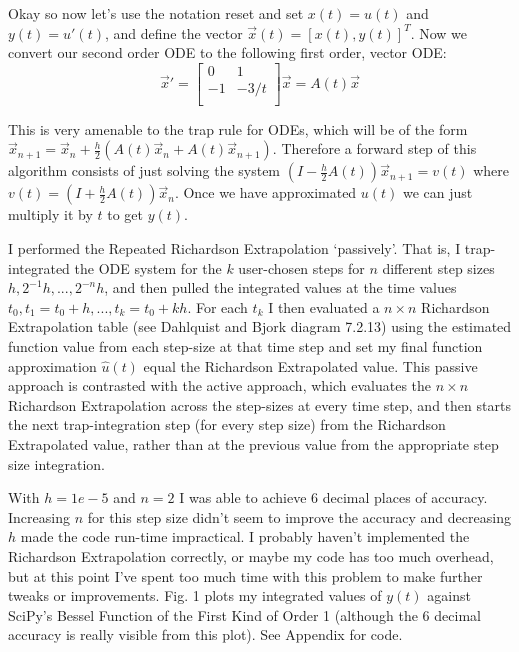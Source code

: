 \documentclass[10pt,a4paper]{article}
\begin{document}
Okay so now let's use the notation reset and set $x(t) = u(t)$ and $y(t) = u'(t)$, and define the vector $\vec{x}(t) = [x(t), y(t)]^T$.  Now we convert our second order ODE to the following first order, vector ODE:
\begin{equation}
\vec{x}' = \left[
\begin{array}{cc}
0 & 1\\
-1 & -3/t\\
\end{array}
\right]
 \vec{x} = A(t) \vec{x}
\end{equation}

This is very amenable to the trap rule for ODEs, which will be  of the form $\vec{x}_{n+1} = \vec{x}_{n} + \frac{h}{2} \left( A(t) \vec{x}_n + A(t) \vec{x}_{n+1} \right)$.  Therefore a forward step of this algorithm consists of just solving the system $(I - \frac{h}{2} A(t)) \vec{x}_{n+1} = v(t)$ where $v(t) = (I + \frac{h}{2} A(t)) \vec{x}_n$.  Once we have approximated $u(t)$ we can just multiply it by $t$ to get $y(t)$.

I performed the Repeated Richardson Extrapolation `passively'.  That is, I trap-integrated the ODE system for the $k$ user-chosen steps for $n$ different step sizes $h, 2^{-1} h,...,2^{-n} h$, and then pulled the integrated values at the time values $t_0, t_1 = t_0 + h, ..., t_k = t_0 + kh$.  For each $t_k$ I then evaluated a $n \times n$ Richardson Extrapolation table (see Dahlquist and Bjork diagram 7.2.13) using the estimated function value from each step-size at that time step and set my final function approximation $\hat{u}(t)$ equal the Richardson Extrapolated value.  This passive approach is contrasted with the active approach, which evaluates the $n \times n$ Richardson Extrapolation across the step-sizes at every time step, and then starts the next trap-integration step (for every step size) from the Richardson Extrapolated value, rather than at the previous value from the appropriate step size integration.

With $h=1e-5$ and $n=2$ I was able to achieve 6 decimal places of accuracy.  Increasing $n$ for this step size didn't seem to improve the accuracy and decreasing $h$ made the code run-time impractical.  I probably haven't implemented the Richardson Extrapolation correctly, or maybe my code has too much overhead, but at this point I've spent too much time with this problem to make further tweaks or improvements.  Fig. 1 plots my integrated values of $y(t)$ against SciPy's Bessel Function of the First Kind of Order 1 (although the 6 decimal accuracy is really visible from this plot).  See Appendix for code.
\end{document}

